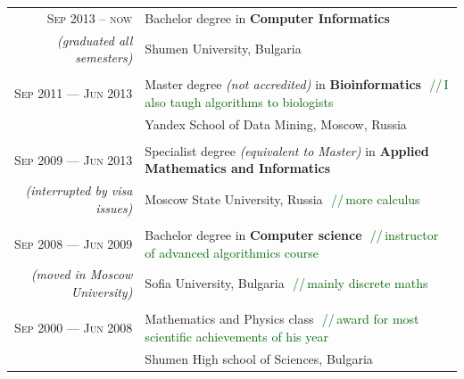 \documentclass[a4paper,10pt]{article}
\def\myline{\color{linegray}\vline}
\newcommand{\minorcolor}[1]{\textcolor{mygray}{#1}}
\newcommand{\comment}[1]{\small\textcolor{darkgreen}{\,\,//\,#1}}
\newcommand{\mydate}[1]{\minorcolor{\textsc{#1}}}
\newcommand{\bracketcomment}[1]{\small\textit{\minorcolor{(#1)}}}
\begin{document}
\hspace{-2mm}\begin{tabular}{r!{\myline}p{14cm}}
  \mydate{Sep 2013 -- now}     &  Bachelor degree in \textbf{Computer Informatics}\\
\bracketcomment{graduated all semesters}  &  Shumen University, Bulgaria\\

        \\
        \mydate{Sep 2011 --- Jun 2013}     &  Master degree \bracketcomment{not accredited} in \textbf{Bioinformatics} \comment{I also taugh algorithms to biologists}\\
	                          &  Yandex School of Data Mining, Moscow, Russia\\
	
        \\
        \mydate{Sep 2009 --- Jun 2013}     &  Specialist degree \bracketcomment{equivalent to Master} in \textbf{Applied Mathematics and Informatics}\\
        \bracketcomment{interrupted by visa issues} & Moscow State University, Russia \comment{more calculus}\\

	\\
        \mydate{Sep 2008 --- Jun 2009}     &  Bachelor degree in \textbf{Computer science} \comment{instructor of advanced algorithmics course}\\
        \bracketcomment{moved in Moscow University} &  %
        Sofia University, Bulgaria \comment{mainly discrete maths}\\
	
	\\
        \mydate{Sep 2000 --- Jun 2008}     &  Mathematics and Physics class \comment{award for most scientific achievements of his year}\\
                                  &  Shumen High school of Sciences, Bulgaria\\
\end{tabular}
\par\smallskip
\end{document}
